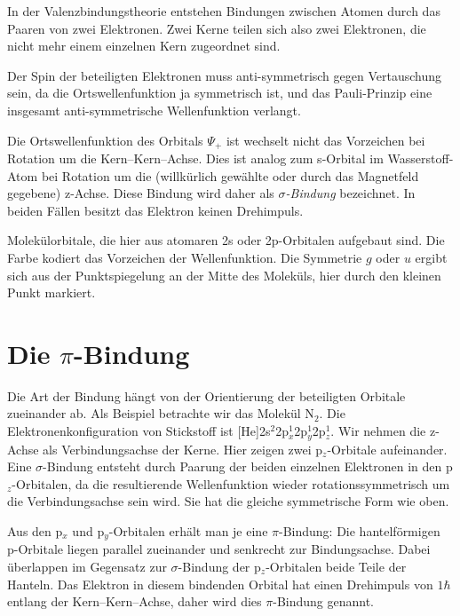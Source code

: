 In der Valenzbindungstheorie entstehen Bindungen zwischen Atomen durch das 
Paaren von zwei Elektronen. Zwei Kerne teilen sich also zwei Elektronen, die nicht mehr einem einzelnen Kern zugeordnet sind.

Der Spin der beteiligten Elektronen muss anti-symmetrisch gegen Vertauschung sein, da die Ortswellenfunktion ja symmetrisch ist, und das Pauli-Prinzip eine insgesamt anti-symmetrische Wellenfunktion  verlangt.

Die Ortswellenfunktion des Orbitals $\Psi_{+}$ ist wechselt nicht das Vorzeichen bei Rotation um die Kern--Kern--Achse. Dies ist analog zum s-Orbital im Wasserstoff-Atom bei Rotation um die (willkürlich gewählte oder durch das Magnetfeld gegebene) z-Achse.  Diese Bindung wird daher als \emph{$\sigma$-Bindung} bezeichnet. In beiden Fällen besitzt das Elektron keinen Drehimpuls.


\begin{marginfigure}
\caption{Molekülorbitale, die hier aus atomaren 2s oder 2p-Orbitalen aufgebaut sind. Die Farbe kodiert das Vorzeichen der Wellenfunktion. Die Symmetrie $g$ oder $u$ ergibt sich aus der Punktspiegelung an der Mitte des Moleküls, hier durch den kleinen Punkt markiert.}
\end{marginfigure}



\section{Die $\pi$-Bindung}

Die Art der Bindung hängt von der Orientierung der beteiligten Orbitale zueinander ab. Als Beispiel betrachte wir das Molekül N$_2$. Die Elektronenkonfiguration von Stickstoff ist [He]2s$^2$2p$_x^1$2p$_y^1$2p$_z^1$. Wir nehmen die z-Achse als Verbindungsachse der Kerne. Hier zeigen zwei p$_z$-Orbitale aufeinander. Eine $\sigma$-Bindung entsteht durch Paarung der beiden einzelnen Elektronen in den  p$_z$-Orbitalen, da die resultierende Wellenfunktion wieder rotationssymmetrisch um die Verbindungsachse sein wird. Sie hat die gleiche symmetrische Form wie oben.

Aus den p$_x$ und p$_y$-Orbitalen erhält man je eine $\pi$-Bindung: Die hantelförmigen p-Orbitale liegen parallel zueinander und senkrecht zur Bindungsachse. Dabei überlappen im Gegensatz zur $\sigma$-Bindung der p$_z$-Orbitalen beide Teile der Hanteln. Das Elektron in diesem bindenden Orbital hat einen Drehimpuls von $1 \hbar$ entlang der Kern--Kern--Achse, daher wird dies $\pi$-Bindung genannt.

